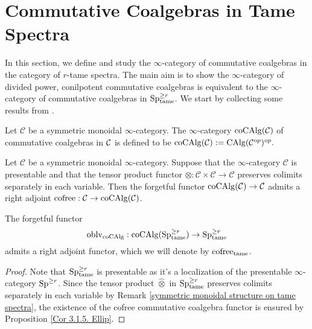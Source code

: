 \section{Commutative Coalgebras in Tame Spectra}
\label{Commutative coalgebras in tame spectra}

In this section, we define and study the $\infty$-category of commutative coalgebras in the category of $r$-tame spectra. 
The main aim is to show the $\infty$-category of divided power, conilpotent commutative coalgebras is equivalent to the $\infty$-category of commutative coalgebras in $\operatorname{Sp}^{\geq r}_{\operatorname{\operatorname{tame}}}$.
We start by collecting some results from \cite{LurieEllipticI}.

\begin{definition}
    Let $\mathcal{C}$ be a symmetric monoidal $\infty$-category. The $\infty$-category $\operatorname{coCAlg}({\mathcal{C}})$ of commutative coalgebras in ${\mathcal{C}}$ is defined to be
    $
    \operatorname{coCAlg}({\mathcal{C}}):= \operatorname{CAlg}({\mathcal{C}}^{op})^{op}.
    $
\end{definition}



\begin{proposition}
\label{Cor 3.1.5. Ellip}
\cite[Corollary 3.1.5]{LurieEllipticI}
	Let $\mathcal{C}$ be a symmetric monoidal $\infty$-category. Suppose that the $\infty$-category $\mathcal{C}$ is presentable and that the tensor product functor $\otimes: \mathcal{C} \times \mathcal{C} \rightarrow \mathcal{C}$ preserves colimits separately in each variable. Then the forgetful functor $\operatorname{coCAlg}(\mathcal{C}) \rightarrow \mathcal{C}$ admits a right adjoint $\operatorname{cofree}: \mathcal{C} \rightarrow \operatorname{coCAlg}(\mathcal{C})$.
\end{proposition}


\begin{corollary}
The forgetful functor 
$$
\operatorname{oblv}_{\operatorname{coCAlg}}:\operatorname{coCAlg}(\operatorname{Sp}_{\operatorname{\operatorname{tame}}}^{\geq r})\to \operatorname{Sp}^{\geq r}_{\operatorname{\operatorname{tame}}}
$$ admits a right adjoint functor, which we will denote by $\operatorname{cofree}_{\operatorname{\operatorname{tame}}}$.
\end{corollary}
\begin{proof}
	 Note that $\operatorname{Sp}^{\geq r}_{\operatorname{\operatorname{tame}}}$ is presentable as it's a localization of the presentable $\infty$-category $\operatorname{Sp}^{\geq r}$. 
	 Since the tensor product $\hat{\otimes}$ in $\operatorname{Sp}_{\operatorname{\operatorname{tame}}}^{\geq r}$ preserves colimits separately in each variable by Remark \ref{symmetric monoidal structure on tame spectra}, the existence of the cofree commutative coalgebra functor is ensured by Proposition \ref{Cor 3.1.5. Ellip}.
\end{proof}


